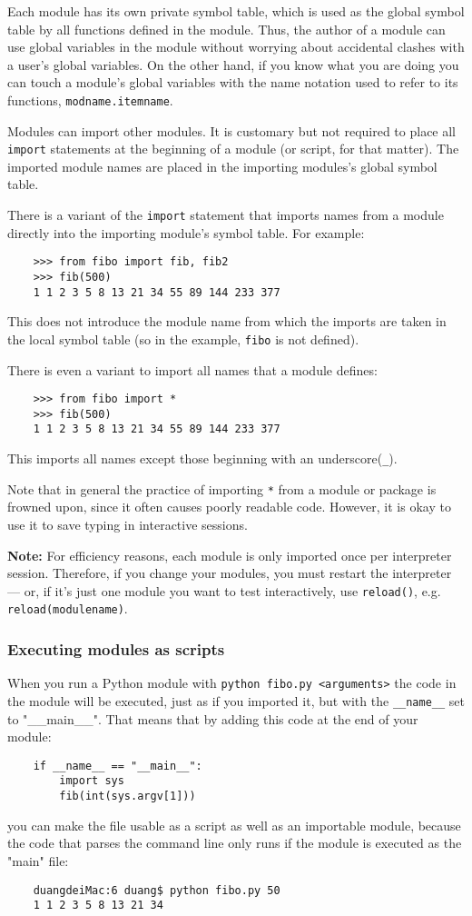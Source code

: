 \documentclass[UTF8]{article}
\begin{document}
Each module has its own private symbol table, which is used as the global symbol table by all
functions defined in the module. Thus, the author of a module can use global variables in the
module without worrying about accidental clashes with a user's global variables. On the other hand,
if you know what you are doing you can touch a module's global variables with the name notation
used to refer to its functions, \texttt{modname.itemname}.

Modules can import other modules. It is customary but not required to place all \texttt{import}
statements at the beginning of a module (or script, for that matter). The imported module names are
placed in the importing modules's global symbol table.

There is a variant of the \texttt{import} statement that imports names from a module directly into
the importing module's symbol table. For example:
\begin{verbatim}
    >>> from fibo import fib, fib2
    >>> fib(500)
    1 1 2 3 5 8 13 21 34 55 89 144 233 377
\end{verbatim}
This does not introduce the module name from which the imports are taken in the local symbol table
(so in the example, \texttt{fibo} is not defined).

There is even a variant to import all names that a module defines:
\begin{verbatim}
    >>> from fibo import *
    >>> fib(500)
    1 1 2 3 5 8 13 21 34 55 89 144 233 377
\end{verbatim}
This imports all names except those beginning with an underscore(\texttt{\_}).

Note that in general the practice of importing \texttt{*} from a module or package is frowned upon,
since it often causes poorly readable code. However, it is okay to use it to save typing in
interactive sessions.

\textbf{Note:} For efficiency reasons, each module is only imported once per interpreter session.
Therefore, if you change your modules, you must restart the interpreter --- or, if it's just one
module you want to test interactively, use \texttt{reload()}, e.g. \texttt{reload(modulename)}.

\subsubsection{Executing modules as scripts}
When you run a Python module with \texttt{python fibo.py <arguments>} the code in the
module will be executed, just as if you imported it, but with the \texttt{\_\_name\_\_} set to
"\_\_main\_\_". That means that by adding this code at the end of your module:
\begin{verbatim}
    if __name__ == "__main__":
        import sys
        fib(int(sys.argv[1]))
\end{verbatim}
you can make the file usable as a script as well as an importable module, because the code that
parses the command line only runs if the module is executed as the "main" file:
\begin{verbatim}
    duangdeiMac:6 duang$ python fibo.py 50
    1 1 2 3 5 8 13 21 34
\end{verbatim}
\end{document}
